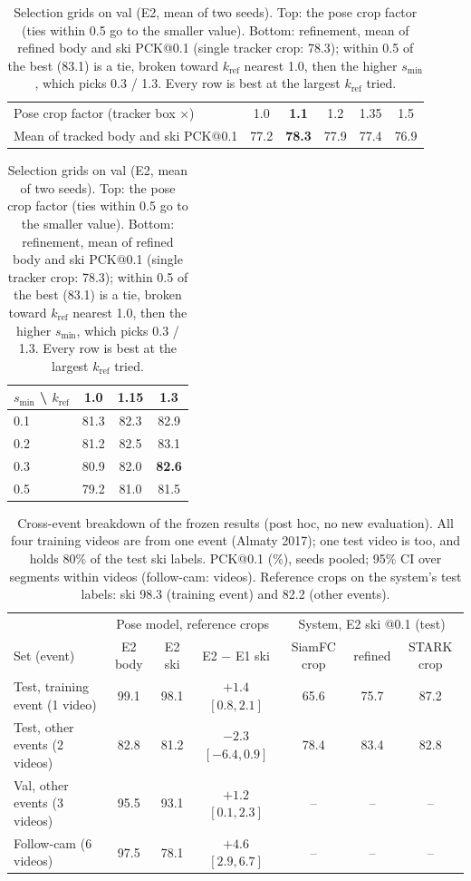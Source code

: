 \documentclass{article}
\begin{document}
\begin{table}[h]
  \centering
  \small
  \begin{tabular}{lccccc}
    \toprule
    Pose crop factor (tracker box $\times$) & 1.0 & \textbf{1.1} & 1.2 & 1.35 & 1.5 \\
    Mean of tracked body and ski PCK@0.1 & 77.2 & \textbf{78.3} & 77.9 & 77.4 & 76.9 \\
    \bottomrule
  \end{tabular}

  \vspace{0.6em}
  \begin{tabular}{lccc}
    \toprule
    $s_{\min}$ \textbackslash{} $k_{\mathrm{ref}}$ & 1.0 & 1.15 & 1.3 \\
    \midrule
    0.1 & 81.3 & 82.3 & 82.9 \\
    0.2 & 81.2 & 82.5 & 83.1 \\
    0.3 & 80.9 & 82.0 & \textbf{82.6} \\
    0.5 & 79.2 & 81.0 & 81.5 \\
    \bottomrule
  \end{tabular}
  \caption{Selection grids on val (E2, mean of two seeds). Top: the pose crop factor (ties within 0.5 go to the
  smaller value). Bottom: refinement, mean of refined body and ski PCK@0.1 (single tracker crop: 78.3); within 0.5 of
  the best (83.1) is a tie, broken toward $k_{\mathrm{ref}}$ nearest 1.0, then the higher $s_{\min}$, which picks
  0.3 / 1.3. Every row is best at the largest $k_{\mathrm{ref}}$ tried.}
  \label{tab:grids_val}
\end{table}

\begin{table}[h]
  \centering
  \small
  \setlength{\tabcolsep}{3.5pt}
  \begin{tabular}{lccc|ccc}
    \toprule
    & \multicolumn{3}{c|}{Pose model, reference crops} & \multicolumn{3}{c}{System, E2 ski @0.1 (test)} \\
    Set (event) & E2 body & E2 ski & E2 $-$ E1 ski & SiamFC crop & refined & STARK crop \\
    \midrule
    Test, training event (1 video) & 99.1 & 98.1 & $+1.4$ $[0.8, 2.1]$ & 65.6 & 75.7 & 87.2 \\
    Test, other events (2 videos) & 82.8 & 81.2 & $-2.3$ $[-6.4, 0.9]$ & 78.4 & 83.4 & 82.8 \\
    Val, other events (3 videos) & 95.5 & 93.1 & $+1.2$ $[0.1, 2.3]$ & -- & -- & -- \\
    Follow-cam (6 videos) & 97.5 & 78.1 & $+4.6$ $[2.9, 6.7]$ & -- & -- & -- \\
    \bottomrule
  \end{tabular}
  \caption{Cross-event breakdown of the frozen results (post hoc, no new evaluation). All four training videos are
  from one event (Almaty 2017); one test video is too, and holds 80\% of the test ski labels. PCK@0.1 (\%), seeds
  pooled; 95\% CI over segments within videos (follow-cam: videos). Reference crops on the system's test labels:
  ski 98.3 (training event) and 82.2 (other events).}
  \label{tab:cross_event}
\end{table}
\end{document}
